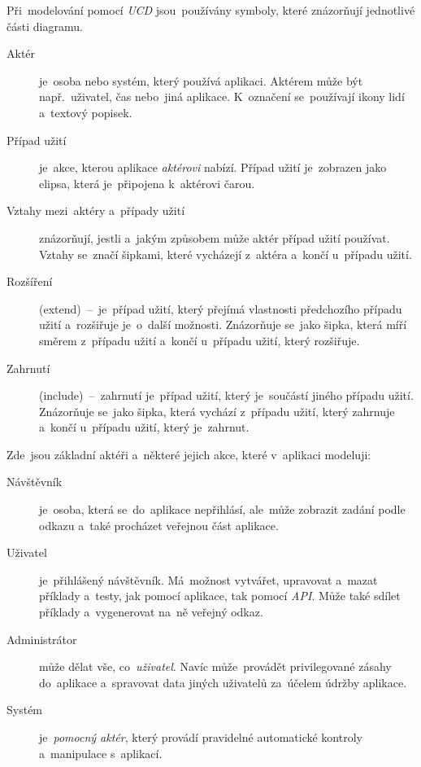\documentclass[11pt,a4paper]{report}
\let\oldacrshort\acrshort
\renewcommand{\acrshort}[1]{\emph{\normalsize\color[rgb]{0,0,0}\noindent\oldacrshort{#1}}}
\begin{document}
                Při~modelování pomocí \emph{UCD} jsou~používány symboly, které znázorňují jednotlivé části diagramu.
                \begin{description}
                    \item[Aktér] je~osoba nebo systém, který používá aplikaci. Aktérem může být např.~uživatel, čas nebo~jiná aplikace. K~označení se~používají ikony lidí a~textový popisek.
                    \item[Případ užití] je~akce, kterou aplikace \emph{aktérovi} nabízí. Případ užití je~zobrazen jako elipsa, která je~připojena k~aktérovi čarou.
                    \item[Vztahy mezi~aktéry a~případy užití] znázorňují, jestli a~jakým způsobem může aktér případ užití používat. Vztahy se~značí šipkami, které vycházejí z~aktéra a~končí u~případu užití.
                    \item[Rozšíření] (extend)~--~je~případ užití, který přejímá vlastnosti předchozího případu užití a~rozšiřuje je~o~další možnosti. Znázorňuje se~jako šipka, která míří směrem z~případu užití a~končí u~případu užití, který rozšiřuje.
                    \item[Zahrnutí] (include)~--~zahrnutí je~případ užití, který je~součástí jiného případu užití. Znázorňuje se~jako šipka, která vychází z~případu užití, který zahrnuje a~končí u~případu užití, který je~zahrnut.
                \end{description}

                Zde~jsou základní aktéři a~některé jejich akce, které v~aplikaci modeluji:
                \begin{description}
                    \item[Návštěvník] je~osoba, která se~do~aplikace nepřihlásí, ale~může zobrazit zadání podle odkazu a~také procházet veřejnou část aplikace.
                    \item[Uživatel] je~přihlášený návštěvník. Má~možnost vytvářet, upravovat a~mazat příklady a~testy, jak pomocí aplikace, tak pomocí \acrshort{API}. Může také sdílet příklady a~vygenerovat na~ně veřejný odkaz.
                    \item[Administrátor] může dělat vše, co~\emph{uživatel}. Navíc může~provádět privilegované zásahy do~aplikace a~spravovat data jiných uživatelů za~účelem údržby aplikace.
                    \item[Systém] je~\emph{pomocný aktér}, který provádí pravidelné automatické kontroly a~manipulace s~aplikací.
                \end{description}
\end{document}
